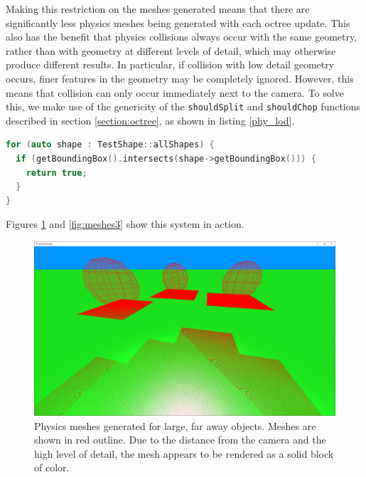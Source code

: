 \documentclass{article}
\begin{document}
Making this restriction on the meshes generated means that there are significantly less physics meshes being generated with each octree update. This also has the benefit that physics collisions always occur with the same geometry, rather than with geometry at different levels of detail, which may otherwise produce different results. In particular, if collision with low detail geometry occurs, finer features in the geometry may be completely ignored. However, this means that collision can only occur immediately next to the camera. To solve this, we make use of the genericity of the \texttt{shouldSplit} and \texttt{shouldChop} functions described in section \ref{section:octree}, as shown in listing \ref{phy_lod}.
\begin{lstlisting}[language=C++,label={phy_lod},caption={Snippet from \texttt{shouldSplit} responsible for increasing the level of detail near a set of test physics objects. All chunks with bounding boxes that intersect the bounding box of a physics shape will be split until the highest detail level is reached. The octree refinement process described in section \ref{section:octree_refinement} ensures that this does not create any places where very different levels of detail are adjacent to each other.}]
for (auto shape : TestShape::allShapes) {
  if (getBoundingBox().intersects(shape->getBoundingBox())) {
    return true;
  }
}
\end{lstlisting}

Figures \ref{fig:meshes2} and \ref{fig:meshes3} show this system in action.

\begin{figure}[H]
  \includegraphics[width=\textwidth]{meshes2.png}
  \caption{Physics meshes generated for large, far away objects. Meshes are shown in red outline. Due to the distance from the camera and the high level of detail, the mesh appears to be rendered as a solid block of color.}
  \label{fig:meshes2}
\end{figure}
\end{document}
